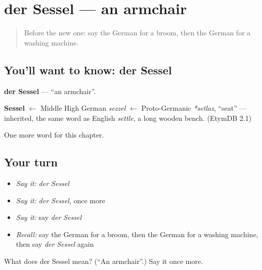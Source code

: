 \section[der Sessel]{der Sessel — an armchair}

\label{lesson:GE-C115-sessel}



\begin{quote}
Before the new one: say the German for a broom, then the German for a washing machine.
\end{quote}

\subsection*{You'll want to know: der Sessel}
\textbf{der Sessel} — \textquotedblleft{}an armchair\textquotedblright{}.

\begin{cousinweb}
\textbf{Sessel} $\leftarrow$ Middle High German \emph{sezzel} $\leftarrow$ Proto-Germanic \emph{*setlaz}, \textquotedblleft{}seat\textquotedblright{} — inherited, the same word as English \emph{settle}, a long wooden bench. (EtymDB 2.1)
\end{cousinweb}

\begin{grammarlens}[title={What you've built}]
One more word for this chapter.
\end{grammarlens}

\subsection*{Your turn}
\begin{itemize}
\raggedright
  \item \emph{Say it:} \emph{der Sessel}
  \item \emph{Say it:} \emph{der Sessel}, once more
  \item \emph{Say it:} say \emph{der Sessel}
  \item \emph{Recall:} say the German for a broom, then the German for a washing machine, then say \emph{der Sessel} again
\end{itemize}

\begin{tcolorbox}[breakable,colback=teal!4,colframe=teal!35!black,title={Before you move on}]
What does der Sessel mean? (\textquotedblleft{}An armchair\textquotedblright{}.) Say it once more.
\end{tcolorbox}
